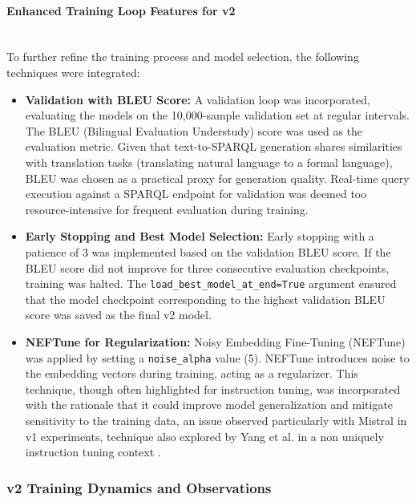 \paragraph{Enhanced Training Loop Features for v2} \mbox{}\\
To further refine the training process and model selection, the following techniques were integrated:
\begin{itemize}
    \item \textbf{Validation with BLEU Score:} A validation loop was incorporated, evaluating the models on the 10,000-sample validation set at regular intervals. The BLEU (Bilingual Evaluation Understudy) score \cite{papineni2002bleu} was used as the evaluation metric. Given that text-to-SPARQL generation shares similarities with translation tasks (translating natural language to a formal language), BLEU was chosen as a practical proxy for generation quality. Real-time query execution against a SPARQL endpoint for validation was deemed too resource-intensive for frequent evaluation during training.
    \item \textbf{Early Stopping and Best Model Selection:} Early stopping with a patience of 3 was implemented based on the validation BLEU score. If the BLEU score did not improve for three consecutive evaluation checkpoints, training was halted. The \texttt{load\_best\_model\_at\_end=True} argument ensured that the model checkpoint corresponding to the highest validation BLEU score was saved as the final v2 model.
    \item \textbf{NEFTune for Regularization:} Noisy Embedding Fine-Tuning (NEFTune) \cite{jain2023neftunenoisyembeddingsimprove} was applied by setting a \texttt{noise\_alpha} value (5). NEFTune introduces noise to the embedding vectors during training, acting as a regularizer. This technique, though often highlighted for instruction tuning, was incorporated with the rationale that it could improve model generalization and mitigate sensitivity to the training data, an issue observed particularly with Mistral in v1 experiments, technique also explored by Yang et al. in a non uniquely instruction tuning context \cite{10.1145/3675249.3675339}.
\end{itemize}

\subsubsection{v2 Training Dynamics and Observations}\label{sec:v2_training_dynamics_revised}

